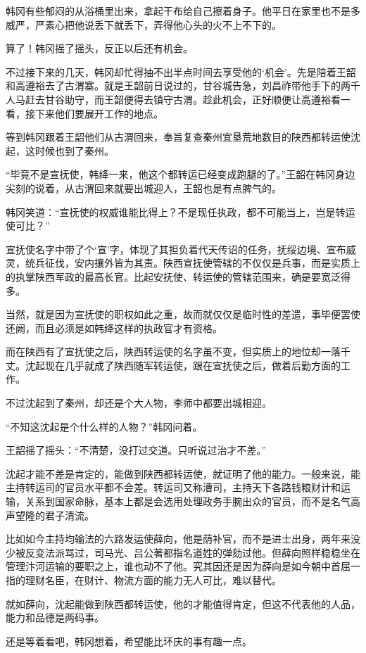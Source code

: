韩冈有些郁闷的从浴桶里出来，拿起干布给自己擦着身子。他平日在家里也不是多威严，严素心把他说丢下就丢下，弄得他心头的火不上不下的。

算了！韩冈摇了摇头，反正以后还有机会。

不过接下来的几天，韩冈却忙得抽不出半点时间去享受他的‘机会’。先是陪着王韶和高遵裕去了古渭寨。就是王韶前日说过的，甘谷城告急，刘昌祚带他手下的两千人马赶去甘谷助守，而王韶便得去镇守古渭。趁此机会，正好顺便让高遵裕看一看，接下来他们要展开工作的地点。

等到韩冈跟着王韶他们从古渭回来，奉旨复查秦州宜垦荒地数目的陕西都转运使沈起，这时候也到了秦州。

“毕竟不是宣抚使，韩绛一来，他这个都转运已经变成跑腿的了。”王韶在韩冈身边尖刻的说着，从古渭回来就要出城迎人，王韶也是有点脾气的。

韩冈笑道：“宣抚使的权威谁能比得上？不是现任执政，都不可能当上，岂是转运使可比？”

宣抚使名字中带了个‘宣’字，体现了其担负着代天传诏的任务，抚绥边境、宣布威灵，统兵征伐，安内攘外皆为其责。陕西宣抚使管辖的不仅仅是兵事，而是实质上的执掌陕西军政的最高长官。比起安抚使、转运使的管辖范围来，确是要宽泛得多。

当然，就是因为宣抚使的职权如此之重，故而就仅仅是临时性的差遣，事毕便罢使还阙，而且必须是如韩绛这样的执政官才有资格。

而在陕西有了宣抚使之后，陕西转运使的名字虽不变，但实质上的地位却一落千丈。沈起现在几乎就成了陕西随军转运使，跟在宣抚使之后，做着后勤方面的工作。

不过沈起到了秦州，却还是个大人物，李师中都要出城相迎。

“不知这沈起是个什么样的人物？”韩冈问着。

王韶摇了摇头：“不清楚，没打过交道。只听说过治才不差。”

沈起才能不差是肯定的，能做到陕西都转运使，就证明了他的能力。一般来说，能主持转运司的官员水平都不会差。转运司又称漕司，主持天下各路钱粮财计和运输，关系到国家命脉，基本上都是会选用处理政务手腕出众的官员，而不是名气高声望隆的君子清流。

比如如今主持均输法的六路发运使薛向，他是荫补官，而不是进士出身，两年来没少被反变法派骂过，司马光、吕公著都指名道姓的弹劾过他。但薛向照样稳稳坐在管理汴河运输的要职之上，谁也动不了他。究其因还是因为薛向是如今朝中首屈一指的理财名臣，在财计、物流方面的能力无人可比，难以替代。

就如薛向，沈起能做到陕西都转运使，他的才能值得肯定，但这不代表他的人品，能力和品德是两码事。

还是等着看吧，韩冈想着，希望能比环庆的事有趣一点。


